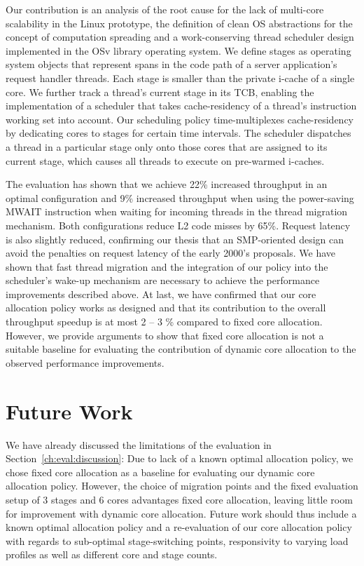 \documentclass[12pt,a4paper]{book}
\begin{document}
Our contribution is an analysis of the root cause for the lack of multi-core scalability in the Linux prototype,
the definition of clean OS abstractions for the concept of computation spreading and
a work-conserving thread scheduler design implemented in the OSv library operating system.
We define stages as operating system objects that represent spans in the code path of a server application's request handler threads.
Each stage is smaller than the private i-cache of a single core.
We further track a thread's current stage in its TCB, enabling the implementation of a scheduler that takes cache-residency of a thread's instruction working set into account.
Our scheduling policy time-multiplexes cache-residency by dedicating cores to stages for certain time intervals.
The scheduler dispatches a thread in a particular stage only onto those cores that are assigned to its current stage, which causes all threads to execute on pre-warmed i-caches.

The evaluation has shown that we achieve 22\% increased throughput in an optimal configuration and 9\% increased throughput when using the power-saving MWAIT instruction when waiting for incoming threads in the thread migration mechanism.
Both configurations reduce L2 code misses by 65\%.
Request latency is also slightly reduced, confirming our thesis that an SMP-oriented design can avoid the penalties on request latency of the early 2000's proposals.
We have shown that fast thread migration and the integration of our policy into the scheduler's wake-up mechanism are necessary to achieve the performance improvements described above.
At last, we have confirmed that our core allocation policy works as designed and that its contribution to the overall throughput speedup is at most 2 -- 3 \% compared to fixed core allocation.
However, we provide arguments to show that fixed core allocation is not a suitable baseline for evaluating the contribution of dynamic core allocation to the observed performance improvements.

\section{Future Work}\label{ch:concl:fw}

We have already discussed the limitations of the evaluation in Section~\ref{ch:eval:discussion}:
Due to lack of a known optimal allocation policy, we chose fixed core allocation as a baseline for evaluating our dynamic core allocation policy.
However, the choice of migration points and the fixed evaluation setup of $3$ stages and $6$ cores advantages fixed core allocation, leaving little room for improvement with dynamic core allocation.
Future work should thus include a known optimal allocation policy and a re-evaluation of our core allocation policy with regards to sub-optimal stage-switching points, responsivity to varying load profiles as well as different core and stage counts.
\end{document}
